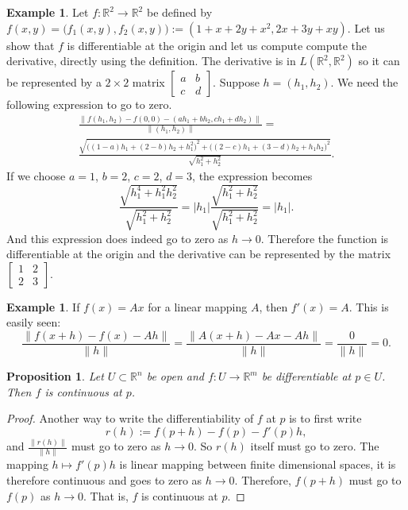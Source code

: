 \documentclass[12pt]{book}
\newcommand{\snorm}[1]{\lVert {#1} \rVert}
\newcommand{\abs}[1]{\left\lvert {#1} \right\rvert}
\newcommand{\R}{{\mathbb{R}}}
\theoremstyle{plain}
\newtheorem{prop}[thm]{Proposition}
\theoremstyle{remark}
\theoremstyle{definition}
\theoremstyle{exercise}
\theoremstyle{example}
\newtheorem{example}[thm]{Example}
\begin{document}
\begin{example}
Let $f \colon \R^2 \to \R^2$ be defined by
$f(x,y) = \bigl(f_1(x,y),f_2(x,y)\bigr) := (1+x+2y+x^2,2x+3y+xy)$.
Let us show that $f$ is differentiable at the origin and let us compute
compute the derivative,
directly using the definition.  The derivative is in $L(\R^2,\R^2)$ so it can be
represented by a $2\times 2$ matrix
$\left[\begin{smallmatrix}a&b\\c&d\end{smallmatrix}\right]$.  Suppose $h =
(h_1,h_2)$.  We need the following expression to go to zero.
\begin{multline*}
\frac{\snorm{
f(h_1,h_2)-f(0,0)
-
(ah_1 +bh_2 , ch_1+dh_2)}
}{\snorm{(h_1,h_2)}}
=
\\
\frac{\sqrt{
{\bigl((1-a)h_1 + (2-b)h_2 + h_1^2\bigr)}^2
+
{\bigl((2-c)h_1 + (3-d)h_2 + h_1h_2\bigr)}^2}}{\sqrt{h_1^2+h_2^2}} .
\end{multline*}
If we choose $a=1$, $b=2$, $c=2$, $d=3$, the expression becomes
\begin{equation*}
\frac{\sqrt{
h_1^4 + h_1^2h_2^2}}{\sqrt{h_1^2+h_2^2}}
=
\abs{h_1}
\frac{\sqrt{
h_1^2 + h_2^2}}{\sqrt{h_1^2+h_2^2}}
= \abs{h_1} .
\end{equation*}
And this expression does indeed go to zero as $h \to 0$.  Therefore the
function is differentiable at the origin and 
the derivative can be represented by the matrix
$\left[\begin{smallmatrix}1&2\\2&3\end{smallmatrix}\right]$.
\end{example}

\begin{example}
If $f(x) = Ax$ for a linear mapping $A$, then
$f'(x) = A$.  This is easily seen:
\begin{equation*}
\frac{\snorm{f(x+h)-f(x) - Ah}}{\snorm{h}}
=
\frac{\snorm{A(x+h)-Ax - Ah}}{\snorm{h}}
=
\frac{0}{\snorm{h}} = 0 .
\end{equation*}
\end{example}

\begin{prop}
Let $U \subset \R^n$ be open and $f \colon U \to \R^m$ be
differentiable at $p \in U$.  Then $f$ is continuous at $p$.
\end{prop}

\begin{proof}
Another way to write the differentiability of $f$ at $p$ is to first write
\begin{equation*}
r(h) := f(p+h)-f(p) - f'(p) h ,
\end{equation*}
and $\frac{\snorm{r(h)}}{\snorm{h}}$ must go to zero as $h \to 0$.
So
$r(h)$ itself must go to zero.  The mapping $h \mapsto f'(p) h$
is linear mapping between finite dimensional spaces, it is
therefore continuous
and goes to zero as $h \to 0$.  Therefore,
$f(p+h)$ must go to $f(p)$ as $h \to 0$.  That is, $f$ is continuous at $p$.
\end{proof}
\end{document}
